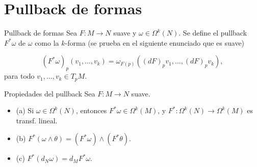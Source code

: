 \section{Pullback de formas}
\begin{bookdefinition}{Pullback de formas}
Sea $F:M\to N$ suave y $\omega\in\Omega^k(N)$. Se define el pullback $F^*\omega$ de $\omega$ como la $k$-forma (se prueba en el siguiente enunciado que es suave)

\[
(F^*\omega)_p(v_1,\ldots,v_k)=\omega_{F(p)}((dF)_pv_1,\ldots,(dF)_pv_k),
\]
para todo $v_1,\ldots,v_k\in T_pM$.

\end{bookdefinition}
\begin{bookproposition}{Propiedades del pullback}
Sea $F:M\to N$ suave.

\begin{itemize}
\item (a) Si $\omega\in\Omega^k(N)$, entonces $F^*\omega\in\Omega^k(M)$, y $F^*:\Omega^k(N)\to\Omega^k(M)$ es transf. lineal.
\item (b) $F^*(\omega\wedge\theta)=(F^*\omega)\wedge(F^*\theta)$.
\item (c) $F^*(d_N\omega)=d_MF^*\omega$.
\end{itemize}
\end{bookproposition}
